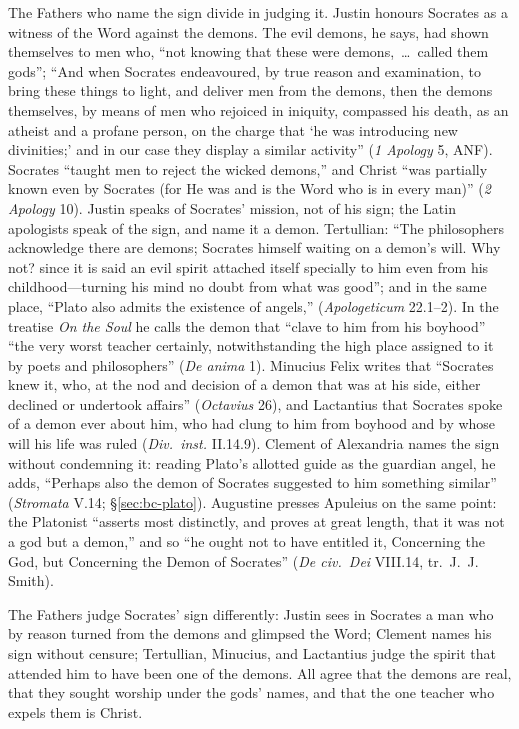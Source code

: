 The Fathers who name the sign divide in judging it. Justin honours
Socrates as a witness of the Word against the demons. The evil demons,
he says, had shown themselves to men who, ``not knowing that these were
demons,~\dots\ called them gods''; ``And when Socrates endeavoured, by
true reason and examination, to bring these things to light, and deliver
men from the demons, then the demons themselves, by means of men who
rejoiced in iniquity, compassed his death, as an atheist and a profane
person, on the charge that `he was introducing new divinities;' and in
our case they display a similar activity'' (\emph{1 Apology} 5, ANF).
Socrates ``taught men to reject the wicked demons,'' and Christ ``was
partially known even by Socrates (for He was and is the Word who is in
every man)'' (\emph{2 Apology} 10). Justin speaks of Socrates' mission,
not of his sign; the Latin apologists speak of the sign, and name it a
demon. Tertullian: ``The philosophers
acknowledge there are demons; Socrates himself waiting on a demon's
will. Why not? since it is said an evil spirit attached itself specially
to him even from his childhood---turning his mind no doubt from what was
good''; and in the same place, ``Plato also admits the existence of
angels,'' 
(\emph{Apologeticum} 22.1--2). In the treatise \emph{On the Soul} he
calls the demon that ``clave to him from his boyhood'' ``the very worst
teacher certainly, notwithstanding the high place assigned to it by
poets and philosophers'' (\emph{De anima} 1). Minucius Felix writes that
``Socrates knew it, who, at the nod and decision of a demon that was at
his side, either declined or undertook affairs'' (\emph{Octavius} 26),
and Lactantius that Socrates spoke of a demon ever about him, who had
clung to him from boyhood and by whose will his life was ruled
(\emph{Div.\ inst.} II.14.9). Clement of Alexandria names the sign
without condemning it: reading Plato's allotted guide as the guardian
angel, he adds, ``Perhaps also the demon of Socrates suggested to him
something similar'' (\emph{Stromata} V.14; \S\ref{sec:bc-plato}). Augustine presses Apuleius on the same
point: the Platonist ``asserts most distinctly, and proves at great
length, that it was not a god but a demon,'' and so ``he ought not to
have entitled it, Concerning the God, but Concerning the Demon of
Socrates'' (\emph{De civ.\ Dei} VIII.14, tr.\ J.~J. Smith).

The Fathers judge Socrates' sign differently: Justin sees
in Socrates a man who by reason turned from the demons and glimpsed the
Word; Clement names his sign without censure; Tertullian, Minucius, and
Lactantius judge the spirit that attended him to have been one of the
demons. All agree that the demons are real, that they sought worship
under the gods' names, and that the one teacher who expels them is
Christ.

